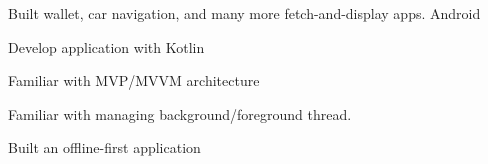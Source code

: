 \begin{cventries}
  \cventry
    {Built wallet, car navigation, and many more fetch-and-display apps.} %
    {Android} %
    {} %
    {} %
    {
      \begin{cvitems} %
        \item {Develop application with Kotlin}
        \item {Familiar with MVP/MVVM architecture}
        \item {Familiar with managing background/foreground thread.}
        \item {Built an offline-first application}
      \end{cvitems}
    }

\end{cventries}
